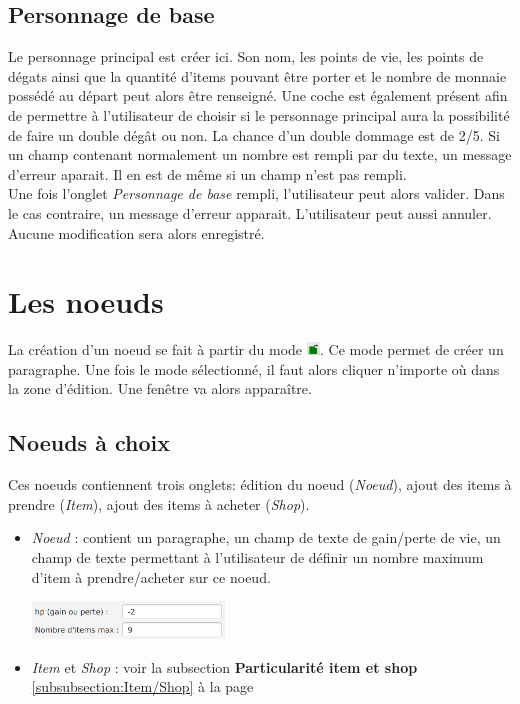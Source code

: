 		\subsection{Personnage de base}
			Le personnage principal est créer ici. Son nom, les points de vie, les points de dégats ainsi que la quantité d'items pouvant être porter et le nombre de monnaie possédé au départ peut alors être renseigné. Une coche est également présent afin de permettre à l'utilisateur de choisir si le personnage principal aura la possibilité de faire un double dégât ou non. La chance d'un double dommage est de 2/5.
			Si un champ contenant normalement un nombre est rempli par du texte, un message d'erreur aparait. Il en est de même si un champ n'est pas rempli.\\
		\newline
		Une fois l'onglet \textit{Personnage de base} rempli, l'utilisateur peut alors valider. Dans le cas contraire, un message d'erreur apparait.
		L'utilisateur peut aussi annuler. Aucune modification sera alors enregistré.

	\section{Les noeuds}
		La création d'un noeud se fait à partir du mode \includegraphics[height=10pt]{img/modeEdition.png}. Ce mode permet de créer un paragraphe. Une fois le mode sélectionné, il faut alors cliquer n'importe où dans la zone d'édition. Une fenêtre va alors apparaître.

		\subsection{Noeuds à choix}
			Ces noeuds contiennent trois onglets: édition du noeud (\textit{Noeud}), ajout des items à prendre (\textit{Item}), ajout des items à acheter (\textit{Shop}).

			\begin{itemize}
				\item \textit{Noeud} : contient un paragraphe, un champ de texte de gain/perte de vie, un champ de texte permettant à l'utilisateur de définir un nombre maximum d'item à prendre/acheter sur ce noeud.
				\begin{center}
					\includegraphics[height=1cm]{img/noeudBasic.png}
				\end{center}

				\item \textit{Item} et \textit{Shop} : voir la subsection \textbf{Particularité item et shop} \ref{subsubsection:Item/Shop} à la page \pageref{subsubsection:Item/Shop}\\
			\end{itemize}

